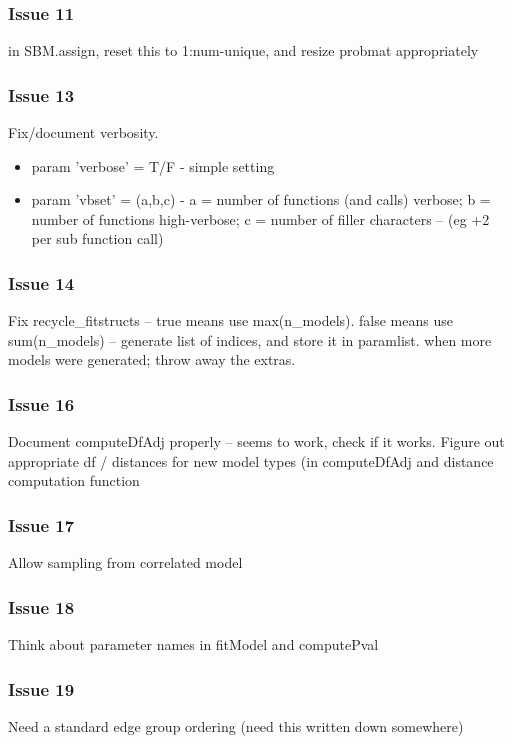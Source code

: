 \documentclass[11pt]{article}
\begin{document}
\subsubsection*{Issue 11}
in SBM.assign, reset this to 1:num-unique, and resize probmat appropriately

\subsubsection*{Issue 13}
Fix/document verbosity. 
\begin{itemize}
\item param 'verbose' = T/F - simple setting
\item param 'vbset' = (a,b,c) - a = number of functions (and calls) verbose; b = number of functions high-verbose; c = number of filler characters -- (eg +2 per sub function call)
\end{itemize}

\subsubsection*{Issue 14}
Fix recycle\_fitstructs -- true means use max(n\_models). false means use sum(n\_models) -- generate list of indices, and store it in paramlist. when more models were generated; throw away the extras. 

\subsubsection*{Issue 16}
Document computeDfAdj properly -- seems to work, check if it works. 
Figure out appropriate df / distances for new model types (in computeDfAdj and distance computation function

\subsubsection*{Issue 17}
Allow sampling from correlated model

\subsubsection*{Issue 18}
Think about parameter names in fitModel and computePval

\subsubsection*{Issue 19}
Need a standard edge group ordering (need this written down somewhere)
\end{document}
